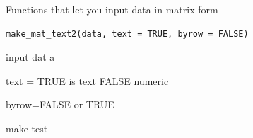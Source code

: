 \documentclass[a4paper]{book}
\begin{document}
%
\begin{Description}
Functions that let you input data in matrix form
\end{Description}
%
\begin{Usage}
\begin{verbatim}
make_mat_text2(data, text = TRUE, byrow = FALSE)
\end{verbatim}
\end{Usage}
%
\begin{Arguments}
\begin{ldescription}
\item[\code{data}] input dat a

\item[\code{text}] text = TRUE is text FALSE numeric

\item[\code{byrow}] byrow=FALSE  or TRUE
\end{ldescription}
\end{Arguments}
%
\begin{Value}
make test
\end{Value}
%
\end{document}
